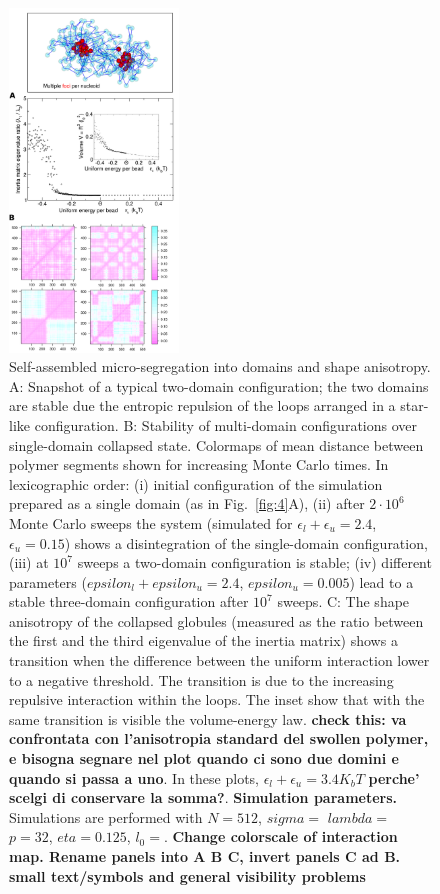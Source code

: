 \documentclass[a4paper,12pt,pre,superscriptaddress]{revtex4}
\begin{document}
\begin{figure}
  \centering
  \includegraphics[width=0.4\textwidth]{fig5}
  \caption{Self-assembled micro-segregation into domains and shape
    anisotropy.  A: Snapshot of a typical two-domain configuration;
    the two domains are stable due the entropic repulsion of the
    loops arranged in a star-like configuration.   
%
B: Stability of multi-domain configurations over single-domain
collapsed 
state. Colormaps of mean distance between polymer segments shown for
increasing Monte Carlo times.  
%
In lexicographic order:  (i)  initial configuration of the simulation 
prepared as a single domain (as in Fig.~\ref{fig:4}A), (ii) after
$2\cdot10^6$ 
Monte Carlo sweeps the system (simulated for
$\epsilon_l+\epsilon_u=2.4$, 
$\epsilon_u=0.15$)  shows a disintegration of the single-domain
configuration,  (iii) 
  at $10^7$  sweeps a two-domain configuration is stable;
  (iv)  different parameters    
($epsilon_l+epsilon_u=2.4$, $epsilon_u=0.005$) lead to a stable
three-domain 
configuration after $10^7$ sweeps.
%  
    C: The shape anisotropy of the collapsed globules (measured as the
    ratio between the first and the third eigenvalue of the inertia
    matrix)  shows a transition when the difference between the
    uniform  
    interaction  lower to a negative threshold. The
    transition is due to 
    the increasing repulsive interaction within the loops. The inset
    show that with  the same transition is visible  the volume-energy
    law.  \textbf{check this:  va 
      confrontata con l'anisotropia standard del swollen polymer,
      e bisogna segnare nel plot quando ci sono due domini e quando si
    passa a uno}. In these plots, 
    $\epsilon_l+\epsilon_u=3.4 K_b T$ \textbf{perche' scelgi di
      conservare la somma?}.  
%
\textbf{Simulation parameters. }
Simulations are performed with $N = 512$, $sigma =$ 
 $lambda =$   $p=32$, $eta=0.125$, $l_0= $.  
%
\textbf{Change colorscale of interaction map. Rename panels into A B
  C, invert panels C ad B. small text/symbols and general visibility problems} }
  \label{fig:5}
\end{figure}
\end{document}
